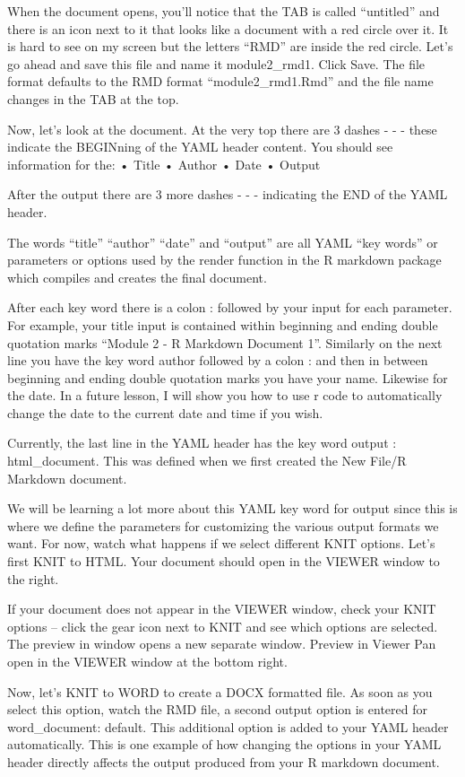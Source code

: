 \documentclass[
]{book}
\begin{document}
When the document opens, you'll notice that the TAB is called ``untitled'' and there is an icon next to it that looks like a document with a red circle over it. It is hard to see on my screen but the letters ``RMD'' are inside the red circle. Let's go ahead and save this file and name it module2\_rmd1. Click Save. The file format defaults to the RMD format ``module2\_rmd1.Rmd'' and the file name changes in the TAB at the top.

Now, let's look at the document. At the very top there are 3 dashes - - - these indicate the BEGINning of the YAML header content. You should see information for the:
• Title
• Author
• Date
• Output

After the output there are 3 more dashes - - - indicating the END of the YAML header.

The words ``title'' ``author'' ``date'' and ``output'' are all YAML ``key words'' or parameters or options used by the render function in the R markdown package which compiles and creates the final document.

After each key word there is a colon : followed by your input for each parameter. For example, your title input is contained within beginning and ending double quotation marks ``Module 2 - R Markdown Document 1''. Similarly on the next line you have the key word author followed by a colon : and then in between beginning and ending double quotation marks you have your name. Likewise for the date. In a future lesson, I will show you how to use r code to automatically change the date to the current date and time if you wish.

Currently, the last line in the YAML header has the key word output : html\_document. This was defined when we first created the New File/R Markdown document.

We will be learning a lot more about this YAML key word for output since this is where we define the parameters for customizing the various output formats we want. For now, watch what happens if we select different KNIT options. Let's first KNIT to HTML. Your document should open in the VIEWER window to the right.

If your document does not appear in the VIEWER window, check your KNIT options -- click the gear icon next to KNIT and see which options are selected. The preview in window opens a new separate window. Preview in Viewer Pan open in the VIEWER window at the bottom right.

Now, let's KNIT to WORD to create a DOCX formatted file. As soon as you select this option, watch the RMD file, a second output option is entered for word\_document: default. This additional option is added to your YAML header automatically. This is one example of how changing the options in your YAML header directly affects the output produced from your R markdown document.
\end{document}
